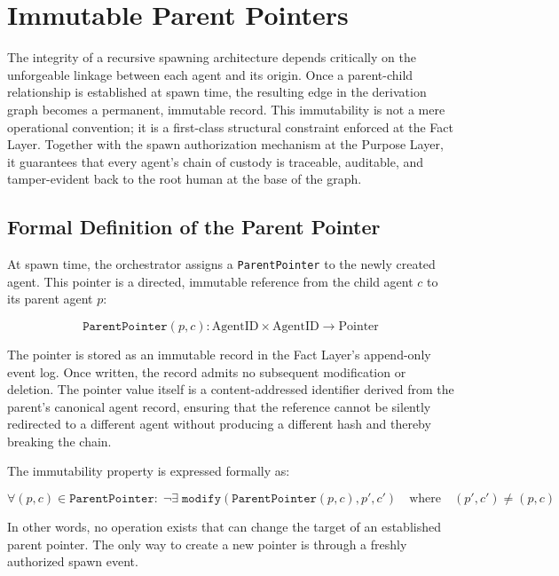 \section{Immutable Parent Pointers}

The integrity of a recursive spawning architecture depends critically on the
unforgeable linkage between each agent and its origin. Once a parent-child
relationship is established at spawn time, the resulting edge in the
derivation graph becomes a permanent, immutable record. This immutability
is not a mere operational convention; it is a first-class structural
constraint enforced at the Fact Layer. Together with the spawn authorization
mechanism at the Purpose Layer, it guarantees that every agent's chain of
custody is traceable, auditable, and tamper-evident back to the root human
at the base of the graph.

\subsection{Formal Definition of the Parent Pointer}

At spawn time, the orchestrator assigns a \texttt{ParentPointer} to the
newly created agent. This pointer is a directed, immutable reference from
the child agent $c$ to its parent agent $p$:

\begin{equation}
  \texttt{ParentPointer}(p, c) : \text{AgentID} \times \text{AgentID}
  \rightarrow \text{Pointer}
\end{equation}

The pointer is stored as an immutable record in the Fact Layer's append-only
event log. Once written, the record admits no subsequent modification or
deletion. The pointer value itself is a content-addressed identifier derived
from the parent's canonical agent record, ensuring that the reference cannot
be silently redirected to a different agent without producing a different
hash and thereby breaking the chain.

The immutability property is expressed formally as:

\begin{equation}
  \forall (p, c) \in \texttt{ParentPointer}: \;
  \neg \exists \; \texttt{modify}(\texttt{ParentPointer}(p, c), p', c')
  \quad \text{where} \quad (p', c') \neq (p, c)
\end{equation}

In other words, no operation exists that can change the target of an
established parent pointer. The only way to create a new pointer is through
a freshly authorized spawn event.

